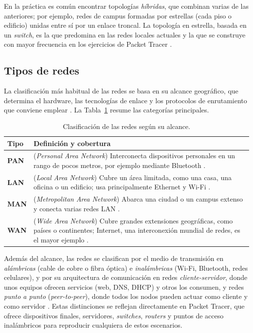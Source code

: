 En la práctica es común encontrar topologías \emph{híbridas}, que combinan varias de las anteriores; por ejemplo, redes de campus formadas por estrellas (cada piso o edificio) unidas entre sí por un enlace troncal. La topología en estrella, basada en un \emph{switch}, es la que predomina en las redes locales actuales y la que se construye con mayor frecuencia en los ejercicios de Packet Tracer \cite{tanenbaum:computer-networks:2021}.

\subsection{Tipos de redes}
\label{sec:prac04:tipos}

La clasificación más habitual de las redes se basa en su alcance geográfico, que determina el hardware, las tecnologías de enlace y los protocolos de enrutamiento que conviene emplear \cite{kurose:computer-networking:2017}. La Tabla~\ref{tab:prac04:tipos} resume las categorías principales.

\begin{table}[H]
    \centering
    \renewcommand{\arraystretch}{1.3}
    \begin{tabular}{|p{1.9cm}|p{12.9cm}|}
        \hline
        \textbf{Tipo} & \textbf{Definición y cobertura} \\ \hline
        \textbf{PAN} & (\emph{Personal Area Network}) Interconecta dispositivos personales en un rango de pocos metros, por ejemplo mediante Bluetooth \cite{forouzan:data-comm-networking:2013}. \\ \hline
        \textbf{LAN} & (\emph{Local Area Network}) Cubre un área limitada, como una casa, una oficina o un edificio; usa principalmente Ethernet y Wi-Fi \cite{tanenbaum:computer-networks:2021}. \\ \hline
        \textbf{MAN} & (\emph{Metropolitan Area Network}) Abarca una ciudad o un campus extenso y conecta varias redes LAN \cite{stallings:data-computer-comm:2014}. \\ \hline
        \textbf{WAN} & (\emph{Wide Area Network}) Cubre grandes extensiones geográficas, como países o continentes; Internet, una interconexión mundial de redes, es el mayor ejemplo \cite{kurose:computer-networking:2017}. \\ \hline
    \end{tabular}
    \caption{Clasificación de las redes según su alcance.}
    \label{tab:prac04:tipos}
\end{table}

Además del alcance, las redes se clasifican por el medio de transmisión en \emph{alámbricas} (cable de cobre o fibra óptica) e \emph{inalámbricas} (Wi-Fi, Bluetooth, redes celulares), y por su arquitectura de comunicación en redes \emph{cliente-servidor}, donde unos equipos ofrecen servicios (web, DNS, DHCP) y otros los consumen, y redes \emph{punto a punto} (\emph{peer-to-peer}), donde todos los nodos pueden actuar como cliente y como servidor \cite{stallings:data-computer-comm:2014}. Estas distinciones se reflejan directamente en Packet Tracer, que ofrece dispositivos finales, servidores, \emph{switches}, \emph{routers} y puntos de acceso inalámbricos para reproducir cualquiera de estos escenarios.


